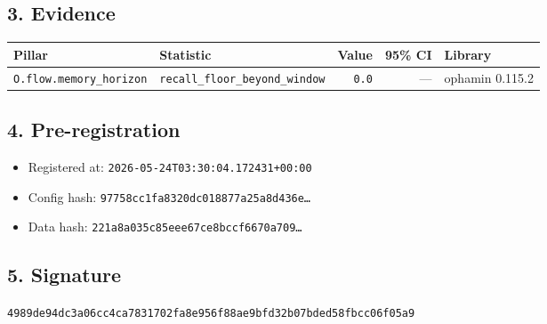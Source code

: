 \documentclass{article}
\begin{document}
\subsection*{3. Evidence}
\begin{tabular}{llrrl}\toprule
\textbf{Pillar} & \textbf{Statistic} & \textbf{Value} & \textbf{95\% CI} & \textbf{Library} \\\midrule
\texttt{O.flow.memory\_horizon} & \texttt{recall\_floor\_beyond\_window} & \texttt{0.0} & --- & ophamin 0.115.2 \\
\bottomrule\end{tabular}
\subsection*{4. Pre-registration}
\begin{itemize}
\item Registered at: \texttt{2026-05-24T03:30:04.172431+00:00}
\item Config hash: \texttt{97758cc1fa8320dc018877a25a8d436e\dots}
\item Data hash: \texttt{221a8a035c85eee67ce8bccf6670a709\dots}
\end{itemize}
\subsection*{5. Signature}
\texttt{4989de94dc3a06cc4ca7831702fa8e956f88ae9bfd32b07bded58fbcc06f05a9}\\
\end{document}
